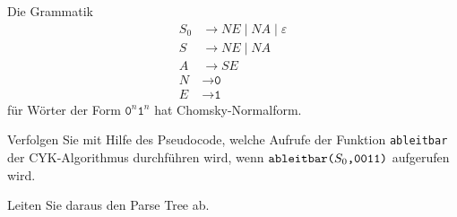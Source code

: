 \def\w#1{\texttt{#1}}
\def\a#1#2#3{
	\texttt{\phantom{#3}ableitbar(}#1\w{,}#2\w{)}
}
Die Grammatik
\begin{align*}
S_0& \to NE \mid NA \mid \varepsilon \\
S  & \to NE \mid NA \\
A  &\to SE \\
N&\to \w{0} \\
E&\to \w{1} 
\end{align*}
für Wörter der Form
$\w{0}^n\w{1}^n$
hat Chomsky-Normalform.
\begin{teilaufgaben}
\item
Verfolgen Sie mit Hilfe des Pseudocode, welche Aufrufe der Funktion
\w{ableitbar} der CYK-Algorithmus durchführen wird, wenn 
$\a{S_0}{\w{0011}}{}$ aufgerufen wird.
\item 
Leiten Sie daraus den Parse Tree ab.
\end{teilaufgaben}



